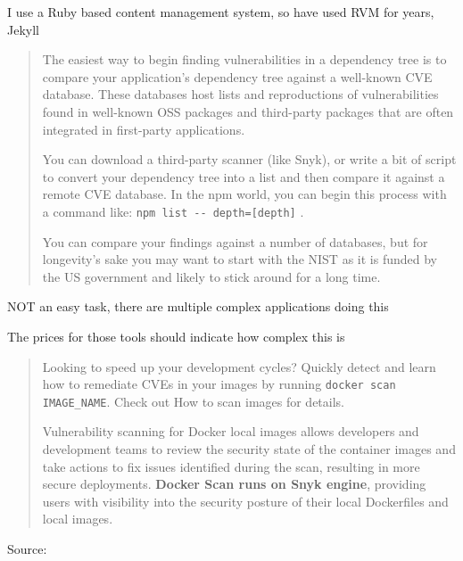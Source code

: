 \documentclass[Screen16to9,17pt]{foils}
\begin{document}
\begin{list2}
\item I use a Ruby based content management system, so have used RVM for years, Jekyll 
\end{list2}





\begin{quote}
The easiest way to begin finding vulnerabilities in a dependency tree is to compare your application’s dependency tree against a well-known CVE database. These databases host lists and reproductions of vulnerabilities found in well-known OSS packages and third-party packages that are often integrated in first-party applications.

You can download a third-party scanner (like Snyk), or write a bit of script to convert your dependency tree into a list and then compare it against a remote CVE database. In the npm world, you can begin this process with a command like: \verb+npm list -- depth=[depth]+ .

You can compare your findings against a number of databases, but for longevity’s
sake you may want to start with the NIST as it is funded by the US government and
likely to stick around for a long time.
\end{quote}

\begin{list2}
\item NOT an easy task, there are multiple complex applications doing this
\item The prices for those tools should indicate how complex this is
\end{list2}





\begin{quote}
Looking to speed up your development cycles? Quickly detect and learn how to remediate CVEs in your images by running \verb+docker scan IMAGE_NAME+. Check out How to scan images for details.

Vulnerability scanning for Docker local images allows developers and development teams to review the security state of the container images and take actions to fix issues identified during the scan, resulting in more secure deployments. {\bf Docker Scan runs on Snyk engine}, providing users with visibility into the security posture of their local Dockerfiles and local images.
\end{quote}
Source: 
\end{document}
